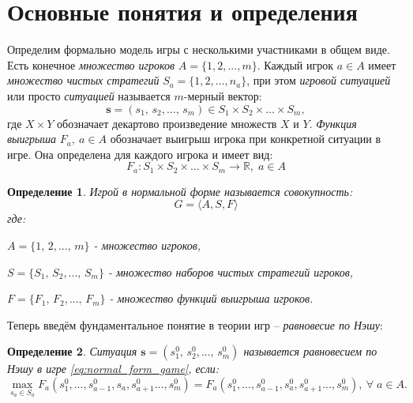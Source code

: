 \section{Основные понятия и определения}

Определим формально модель игры с несколькими участниками в общем виде.
Есть конечное \textit{множество игроков} $A = \{1, 2, ..., m \}$. 
Каждый игрок $a \in A$ имеет 
\textit{множество чистых стратегий} $S_a=\{1,2,...,n_a\}$, при этом 
\textit{игровой ситуацией} или просто \textit{ситуацией}
называется $m$-мерный вектор:
\begin{equation}
	\label{eq:game_situation}
	\textbf{s} = (s_1, \, s_2, \ldots , \, s_m) \in
	S_1 \times S_2 \times \ldots \times S_m,
\end{equation}
где $X \times Y$ обозначает декартово произведение множеств $X$ и $Y$.
\textit{Функция выигрыша} $F_a, \: a \in A$ обозначает выигрыш игрока при
конкретной ситуации в игре. Она определена для каждого игрока и имеет 
вид:
\begin{equation}
	\label{eq:single_dim_payoff_function}
	F_a: S_1 \times S_2 \times \ldots \times S_m \rightarrow 
	\mathbb R, \; a \in A
\end{equation}

\newtheorem{Defenition}{Определение}
\begin{Defenition}
	Игрой в нормальной форме называется совокупность:
	\begin{equation}
		G = \big \langle A, S, F \big \rangle
		\label{eq:normal_form_game}
	\end{equation}
	где: 
 
	$ A = \{1, \, 2, ..., \, m\}$ - множество игроков,

	$ S = \{S_1, \, S_2, ..., \, S_m\}$ - множество наборов чистых
	стратегий игроков,

	$ F = \{F_1, \, F_2, ..., \, F_m\}$ - множество функций выигрыша
	игроков. 
	\cite{vasin}
\end{Defenition}

\begin{flushleft}
Теперь введём фундаментальное понятие в теории игр --
\textit{равновесие по Нэшу}:
\end{flushleft}
\begin{Defenition}
	Ситуация $\textbf{s} = (s_1^0, \, s_2^0, ..., \, s_m^0)$ называется
	\cite{vasin} равновесием по Нэшу в игре \eqref{eq:normal_form_game},
	если:
	\begin{equation}
		\max \limits_{s_a \in S_a} 
		F_a(s_1^0, ..., s_{a-1}^0, s_a, s_{a+1}^0..., s_m^0)=
		F_a(s_1^0, ..., s_{a-1}^0, s_a^0, s_{a+1}^0..., s_m^0),
		\: \forall \; a \in A.
		\label{eq:nash_equilibrium}
	\end{equation}
\end{Defenition}

